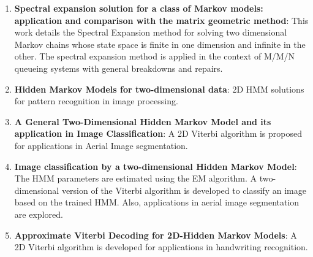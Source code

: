 \documentclass[12pt, draftcls, onecolumn]{IEEEtran}
\begin{document}
\begin{enumerate}
    \item \textbf{Spectral expansion solution for a class of Markov models: application and comparison with the matrix geometric method}: This work details the Spectral Expansion method for solving two dimensional Markov chains whose state space is finite in one dimension and infinite in the other. The spectral expansion method is applied in the context of M/M/N queueing systems with general breakdowns and repairs.
    \item \textbf{Hidden Markov Models for two-dimensional data}: 2D HMM solutions for pattern recognition in image processing.
    \item \textbf{A General Two-Dimensional Hidden Markov Model and its application in Image Classification}: A 2D Viterbi algorithm is proposed for applications in Aerial Image segmentation.
    \item \textbf{Image classification by a two-dimensional Hidden Markov Model}: The HMM parameters are estimated using the EM algorithm. A two-dimensional version of the Viterbi algorithm is developed to classify an image based on the trained HMM. Also, applications in aerial image segmentation are explored.
    \item \textbf{Approximate Viterbi Decoding for 2D-Hidden Markov Models}: A 2D Viterbi algorithm is developed for applications in handwriting recognition.
\end{enumerate}
\end{document}
